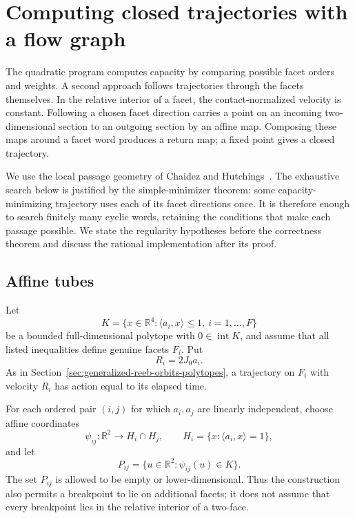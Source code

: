 \section{Computing closed trajectories with a flow graph}
\label{sec:flow-graph-algorithm-ch2021}

The quadratic program computes capacity by comparing possible facet orders
and weights. A second approach follows trajectories through the facets
themselves. In the relative interior of a facet, the contact-normalized
velocity is constant. Following a chosen facet direction carries a
point on an incoming two-dimensional section to an outgoing section by an
affine map. Composing these maps around a facet word produces a return map;
a fixed point gives a closed trajectory.

We use the local passage geometry of Chaidez and Hutchings~\cite{CH2021}.
The exhaustive search below is justified by the simple-minimizer theorem:
some capacity-minimizing trajectory uses each of its facet directions once.
It is therefore enough to search finitely many cyclic words, retaining the
conditions that make each passage possible. We state the regularity
hypotheses before the correctness theorem and discuss the rational
implementation after its proof.

\subsection{Affine tubes}
\label{subsec:flow-graph-algorithm-ch2021-definition}

Let
\[
  K=\{x\in\mathbb R^4:\langle a_i,x\rangle\leq1,
  \ i=1,\ldots,F\}
\]
be a bounded full-dimensional polytope with \(0\in\operatorname{int}K\), and
assume that all listed inequalities define genuine facets \(F_i\).  Put
\[
  R_i=2J_0a_i .
\]
As in Section~\ref{sec:generalized-reeb-orbits-polytopes}, a trajectory on
\(F_i\) with velocity \(R_i\) has action equal to its elapsed time.

For each ordered pair \((i,j)\) for which \(a_i,a_j\) are linearly
independent, choose affine coordinates
\[
  \psi_{ij}:\mathbb R^2\longrightarrow
  H_i\cap H_j,
  \qquad H_i=\{x:\langle a_i,x\rangle=1\},
\]
and let
\[
  P_{ij}=\{u\in\mathbb R^2:\psi_{ij}(u)\in K\}.
\]
The set \(P_{ij}\) is allowed to be empty or lower-dimensional.  Thus the
construction also permits a breakpoint to lie on additional facets; it does
not assume that every breakpoint lies in the relative interior of a
two-face.


